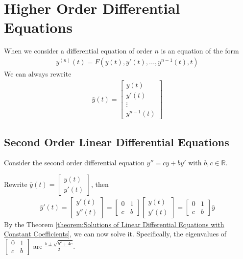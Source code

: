 \documentclass[11pt]{elegantbook}
\begin{document}
\section{Higher Order Differential Equations}
When we consider a differential equation of order $n$ is an equation of the form
\begin{equation}
    \begin{aligned}
        y^{(n)}(t)=F\left(y(t),y'(t),...,y^{n-1}(t),t\right)
    \end{aligned}
    \nonumber
\end{equation}
We can always rewrite
\begin{equation}
    \begin{aligned}
        \bar{y}(t)=\begin{bmatrix}
            y(t)\\y'(t)\\
            \vdots\\y^{n-1}(t)
        \end{bmatrix}
    \end{aligned}
    \nonumber
\end{equation}

\subsection{Second Order Linear Differential Equations}
Consider the second order differential equation $y'' = cy + by'$ with $b, c \in \mathbb{R}$.

Rewrite $\bar{y}(t)=\begin{bmatrix}
    y(t)\\ y'(t)
\end{bmatrix}$, then
\begin{equation}
    \begin{aligned}
        \bar{y}'(t)=\begin{bmatrix}
            y'(t)\\ y''(t)
        \end{bmatrix}=\begin{bmatrix}
            0&1\\
            c&b
        \end{bmatrix}\begin{bmatrix}
            y(t)\\ y'(t)
        \end{bmatrix}=\begin{bmatrix}
            0&1\\
            c&b
        \end{bmatrix}\bar{y}
    \end{aligned}
    \nonumber
\end{equation}
By the Theorem \ref{theorem:Solutions of Linear Differential Equations with Constant Coefficients}, we can now solve it. Specifically, the eigenvalues of $\begin{bmatrix}
    0&1\\
    c&b
\end{bmatrix}$ are $\frac{b\pm\sqrt{b^2+4c}}{2}$.
\end{document}
